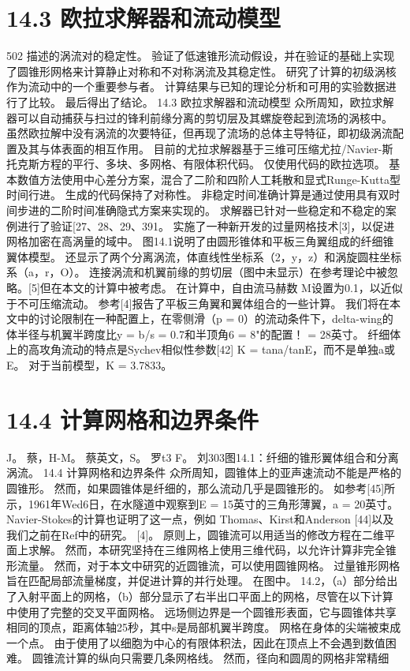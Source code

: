 \documentclass[UTF8,11pt,a4paper,openany,fontset=fandol]{ctexbook}
\begin{document}
\section{14.3 欧拉求解器和流动模型}
502 描述的涡流对的稳定性。 验证了低速锥形流动假设，并在验证的基础上实现了圆锥形网格来计算静止对称和不对称涡流及其稳定性。 研究了计算的初级涡核作为流动中的一个重要参与者。 计算结果与已知的理论分析和可用的实验数据进行了比较。 最后得出了结论。 14.3 欧拉求解器和流动模型 众所周知，欧拉求解器可以自动捕获与扫过的锋利前缘分离的剪切层及其螺旋卷起到流场的涡核中。 虽然欧拉解中没有涡流的次要特征，但再现了流场的总体主导特征，即初级涡流配置及其与体表面的相互作用。 目前的尤拉求解器基于三维可压缩尤拉/Navier-斯托克斯方程的平行、多块、多网格、有限体积代码。 仅使用代码的欧拉选项。 基本数值方法使用中心差分方案，混合了二阶和四阶人工耗散和显式Runge-Kutta型时间行进。 生成的代码保持了对称性。 非稳定时间准确计算是通过使用具有双时间步进的二阶时间准确隐式方案来实现的。 求解器已针对一些稳定和不稳定的案例进行了验证[27、28、29、391。 实施了一种新开发的过量网格技术[3]，以促进网格加密在高涡量的域中。 图14.1说明了由圆形锥体和平板三角翼组成的纤细锥翼体模型。 还显示了两个分离涡流，体直线性坐标系（2，y，z）和涡旋圆柱坐标系（a，r，O）。 连接涡流和机翼前缘的剪切层（图中未显示）在参考理论中被忽略。[5]但在本文的计算中被考虑。 在计算中，自由流马赫数 M设置为0.1，以近似于不可压缩流动。 参考[4]报告了平板三角翼和翼体组合的一些计算。 我们将在本文中的讨论限制在一种配置上，在零侧滑（p = 0）的流动条件下，delta-wing的体半径与机翼半跨度比y = b/s = 0.7和半顶角6 = 8"的配置！ = 28英寸。 纤细体上的高攻角流动的特点是Sychev相似性参数[42] K = tana/tanE，而不是单独a或E。 对于当前模型，K = 3.7833。

\section{14.4 计算网格和边界条件}
J。 蔡，H-M。 蔡英文，S。 罗t3 F。 刘303图14.1：纤细的锥形翼体组合和分离涡流。 14.4 计算网格和边界条件 众所周知，圆锥体上的亚声速流动不能是严格的圆锥形。 然而，如果圆锥体是纤细的，那么流动几乎是圆锥形的。 如参考[45]所示，1961年Wed6日，在水隧道中观察到E = 15英寸的三角形薄翼，a = 20英寸。 Navier-Stokes的计算也证明了这一点，例如 Thomas、Kirst和Anderson [44]以及我们之前在Ref中的研究。 [4]。 原则上，圆锥流可以用适当的修改方程在二维平面上求解。 然而，本研究坚持在三维网格上使用三维代码，以允许计算非完全锥形流量。 然而，对于本文中研究的近圆锥流，可以使用圆锥网格。 过量锥形网格旨在匹配局部流量梯度，并促进计算的并行处理。 在图中。 14.2，（a）部分给出了入射平面上的网格，（b）部分显示了右半出口平面上的网格，尽管在以下计算中使用了完整的交叉平面网格。 远场侧边界是一个圆锥形表面，它与圆锥体共享相同的顶点，距离体轴25秒，其中s是局部机翼半跨度。 网格在身体的尖端被束成一个点。 由于使用了以细胞为中心的有限体积法，因此在顶点上不会遇到数值困难。 圆锥流计算的纵向只需要几条网格线。 然而，径向和圆周的网格非常精细
\end{document}
